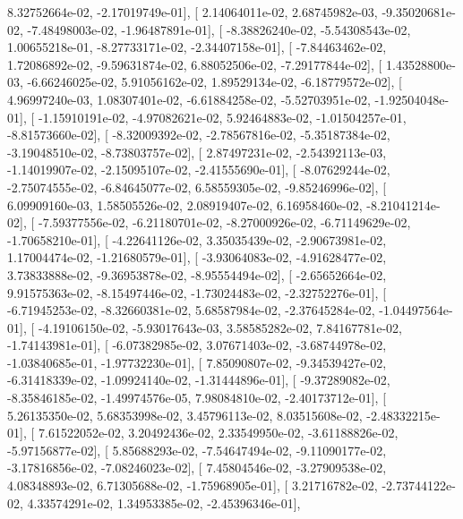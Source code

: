 \documentclass{article}
\begin{document}
          8.32752664e-02,  -2.17019749e-01],
       [  2.14064011e-02,   2.68745982e-03,  -9.35020681e-02,
         -7.48498003e-02,  -1.96487891e-01],
       [ -8.38826240e-02,  -5.54308543e-02,   1.00655218e-01,
         -8.27733171e-02,  -2.34407158e-01],
       [ -7.84463462e-02,   1.72086892e-02,  -9.59631874e-02,
          6.88052506e-02,  -7.29177844e-02],
       [  1.43528800e-03,  -6.66246025e-02,   5.91056162e-02,
          1.89529134e-02,  -6.18779572e-02],
       [  4.96997240e-03,   1.08307401e-02,  -6.61884258e-02,
         -5.52703951e-02,  -1.92504048e-01],
       [ -1.15910191e-02,  -4.97082621e-02,   5.92464883e-02,
         -1.01504257e-01,  -8.81573660e-02],
       [ -8.32009392e-02,  -2.78567816e-02,  -5.35187384e-02,
         -3.19048510e-02,  -8.73803757e-02],
       [  2.87497231e-02,  -2.54392113e-03,  -1.14019907e-02,
         -2.15095107e-02,  -2.41555690e-01],
       [ -8.07629244e-02,  -2.75074555e-02,  -6.84645077e-02,
          6.58559305e-02,  -9.85246996e-02],
       [  6.09909160e-03,   1.58505526e-02,   2.08919407e-02,
          6.16958460e-02,  -8.21041214e-02],
       [ -7.59377556e-02,  -6.21180701e-02,  -8.27000926e-02,
         -6.71149629e-02,  -1.70658210e-01],
       [ -4.22641126e-02,   3.35035439e-02,  -2.90673981e-02,
          1.17004474e-02,  -1.21680579e-01],
       [ -3.93064083e-02,  -4.91628477e-02,   3.73833888e-02,
         -9.36953878e-02,  -8.95554494e-02],
       [ -2.65652664e-02,   9.91575363e-02,  -8.15497446e-02,
         -1.73024483e-02,  -2.32752276e-01],
       [ -6.71945253e-02,  -8.32660381e-02,   5.68587984e-02,
         -2.37645284e-02,  -1.04497564e-01],
       [ -4.19106150e-02,  -5.93017643e-03,   3.58585282e-02,
          7.84167781e-02,  -1.74143981e-01],
       [ -6.07382985e-02,   3.07671403e-02,  -3.68744978e-02,
         -1.03840685e-01,  -1.97732230e-01],
       [  7.85090807e-02,  -9.34539427e-02,  -6.31418339e-02,
         -1.09924140e-02,  -1.31444896e-01],
       [ -9.37289082e-02,  -8.35846185e-02,  -1.49974576e-05,
          7.98084810e-02,  -2.40173712e-01],
       [  5.26135350e-02,   5.68353998e-02,   3.45796113e-02,
          8.03515608e-02,  -2.48332215e-01],
       [  7.61522052e-02,   3.20492436e-02,   2.33549950e-02,
         -3.61188826e-02,  -5.97156877e-02],
       [  5.85688293e-02,  -7.54647494e-02,  -9.11090177e-02,
         -3.17816856e-02,  -7.08246023e-02],
       [  7.45804546e-02,  -3.27909538e-02,   4.08348893e-02,
          6.71305688e-02,  -1.75968905e-01],
       [  3.21716782e-02,  -2.73744122e-02,   4.33574291e-02,
          1.34953385e-02,  -2.45396346e-01],
\end{document}
